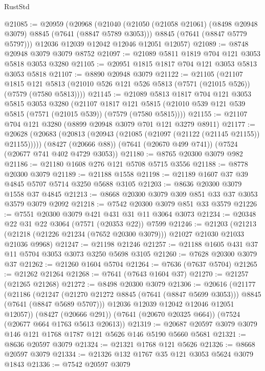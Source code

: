 \begin{lexlean}{RustStd}
\begin{coremodule}
{\begin{coremodule}
{{{{{{{{{{{{{{{{{{{{{{{{{{{{{{{{@21085 := @20959
    (@20968
      (@21040
        (@21050 (@21058 @21061) (@8498 @20948 @3079) @8845 (@7641 (@8847 @5789 @3053)))
        @8845
        (@7641 (@8847 @5779 @5797)))
      @12036
      @12039
      @12042
      @12046
      @12051
      @12057)
@21089 := @8748 @20948 @3079 @3079 @8752
@21097 := @21089 @5811 @1819 @704 @121 @3053 @5818 @3053 @3280
@21105 := @20951 @1815 @1817 @704 @121 @3053 @5813 @3053 @5818
@21107 := @8890 @20948 @3079
@21122 := @21105
    (@21107
      @1815
      @121
      @5813
      (@21010 @526 @121 @526 @5813 (@7571 (@21015 @526)) (@7579 (@7580 @5813))))
@21145 := @21089
    @5813
    @1817
    @704
    @121
    @3053
    @5815
    @3053
    @3280
    (@21107
      @1817
      @121
      @5815
      (@21010 @539 @121 @539 @5815 (@7571 (@21015 @539)) (@7579 (@7580 @5815))))
@21155 := @21107 @704 @121 @3280 (@8899 @20948 @3079 @701 @121 @3279 @8911)
@21177 := @20628
    (@20683 (@20813 (@20943 (@21085 (@21097 (@21122 (@21145 @21155)) @21155)))))
    (@8427 (@20666 @88))
    (@7641 (@20670 @499 @741))
    (@7524 (@20677 @741 @402 @4729 @3053))
@21180 := @8765 @20300 @3079 @982
@21186 := @21180 @1608 @276 @121 @5708 @5715 @3556
@21188 := @8778 @20300 @3079
@21189 := @21188 @1558
@21198 := @21189 @1607 @37 @39 @4845 @5707 @5714 @3250 @5688 @3105
@21203 := @8636 @20300 @3079 @1558 @37 @4845
@21213 := @8668 @20300 @3079 @309 @851 @33 @37 @3053 @3579 @3079 @2092
@21218 := @7542 @20300 @3079 @851 @33 @3579
@21226 := @7551 @20300 @3079 @421 @431 @31 @11 @3064 @3073
@21234 := @20348 @22 @31 @22 @3064 (@7571 (@20353 @22)) @7599
@21246 := @21203
    (@21213 (@21218 (@21226 @21234 (@7652 @20300 @3079))) @21027 @21030 @21033 @21036 @9968)
@21247 := @21198 @21246
@21257 := @21188 @1605 @431 @37 @11 @5704 @3053 @3073 @3250 @5698 @3105
@21260 := @7628 @20300 @3079 @37
@21262 := @21260 @1604 @5704
@21264 := @7636 (@7637 @5704)
@21265 := @21262 @21264
@21268 := @7641 (@7643 @1604 @37)
@21270 := @21257 (@21265 @21268)
@21272 := @8498 @20300 @3079
@21306 := @20616
    (@21177
      (@21186
        (@21247 (@21270 @21272 @8845 (@7641 (@8847 @5699 @3053))) @8845 (@7641 (@8847 @5689 @5707)))
        @12036
        @12039
        @12042
        @12046
        @12051
        @12057))
    (@8427 (@20666 @291))
    (@7641 (@20670 @20325 @664))
    (@7524 (@20677 @664 @1763 @5613 @20613))
@21319 := @20687 @20597 @3079 @3079 @146 @121 @1768 @1787 @121 @5626 @146 @5190 @5660 @5681
@21321 := @8636 @20597 @3079
@21324 := @21321 @1768 @121 @5626
@21326 := @8668 @20597 @3079
@21334 := @21326 @132 @1767 @35 @121 @3053 @5624 @3079 @1843
@21336 := @7542 @20597 @3079
}}}}}}}}}}}}}}}}}}}}}}}}}}}}}}}}
\end{coremodule}}
\end{coremodule}
\end{lexlean}
